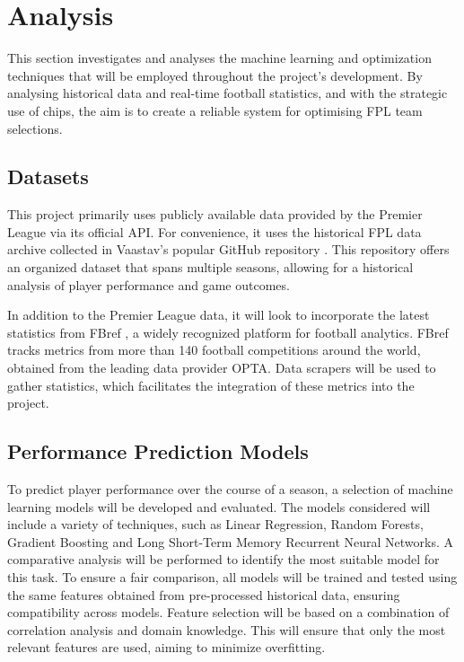 \chapter{Analysis}

This section investigates and analyses the machine learning and optimization techniques that will be employed throughout the project's development. By analysing historical data and real-time football statistics, and with the strategic use of chips, the aim is to create a reliable system for optimising FPL team selections.

\section{Datasets}

This project primarily uses publicly available data provided by the Premier League via its official API. For convenience, it uses the historical FPL data archive collected in Vaastav's popular GitHub repository \cite{vaastav_fantasy_2021}. This repository offers an organized dataset that spans multiple seasons, allowing for a historical analysis of player performance and game outcomes.

In addition to the Premier League data, it will look to incorporate the latest statistics from FBref \cite{fbref}, a widely recognized platform for football analytics. FBref tracks metrics from more than 140 football competitions around the world, obtained from the leading data provider OPTA. Data scrapers will be used to gather statistics, which facilitates the integration of these metrics into the project.

\section{Performance Prediction Models}

To predict player performance over the course of a season, a selection of machine learning models will be developed and evaluated. The models considered will include a variety of techniques, such as Linear Regression, Random Forests, Gradient Boosting and Long Short-Term Memory Recurrent Neural Networks. A comparative analysis will be performed to identify the most suitable model for this task. To ensure a fair comparison, all models will be trained and tested using the same features obtained from pre-processed historical data, ensuring compatibility across models. Feature selection will be based on a combination of correlation analysis and domain knowledge. This will ensure that only the most relevant features are used, aiming to minimize overfitting. 

